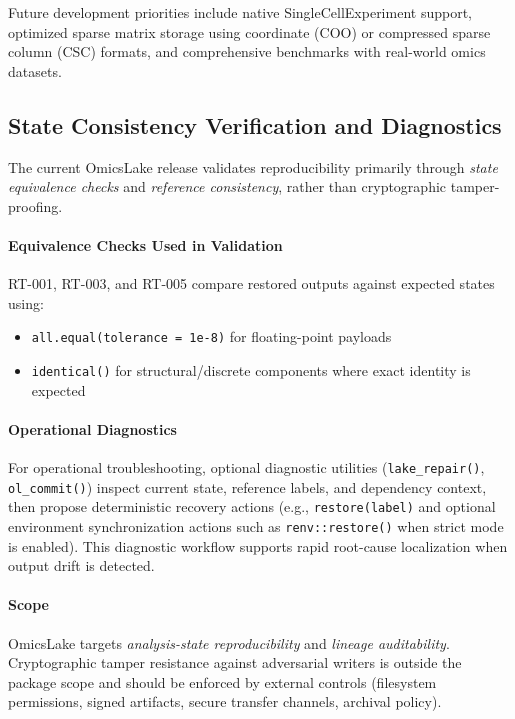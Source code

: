 \documentclass[11pt,a4paper]{article}
\begin{document}
Future development priorities include native SingleCellExperiment support, optimized sparse matrix storage using coordinate (COO) or compressed sparse column (CSC) formats, and comprehensive benchmarks with real-world omics datasets.

\subsection{State Consistency Verification and Diagnostics}

The current OmicsLake release validates reproducibility primarily through \emph{state equivalence checks} and \emph{reference consistency}, rather than cryptographic tamper-proofing.

\paragraph{Equivalence Checks Used in Validation}
RT-001, RT-003, and RT-005 compare restored outputs against expected states using:
\begin{itemize}
    \item \texttt{all.equal(tolerance = 1e-8)} for floating-point payloads
    \item \texttt{identical()} for structural/discrete components where exact identity is expected
\end{itemize}

\paragraph{Operational Diagnostics}
For operational troubleshooting, optional diagnostic utilities (\texttt{lake\_repair()}, \texttt{ol\_commit()}) inspect current state, reference labels, and dependency context, then propose deterministic recovery actions (e.g., \texttt{restore(label)} and optional environment synchronization actions such as \texttt{renv::restore()} when strict mode is enabled). This diagnostic workflow supports rapid root-cause localization when output drift is detected.

\paragraph{Scope}
OmicsLake targets \emph{analysis-state reproducibility} and \emph{lineage auditability}. Cryptographic tamper resistance against adversarial writers is outside the package scope and should be enforced by external controls (filesystem permissions, signed artifacts, secure transfer channels, archival policy).
\end{document}
